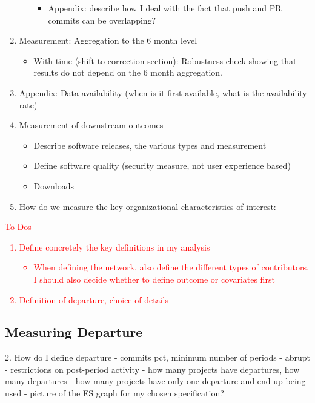\documentclass[12pt,notitlepage]{article}
\begin{document}
\begin{enumerate}
\begin{itemize}
\begin{itemize}
            \item Appendix: describe how I deal with the fact that push and PR commits can be overlapping? 
        \end{itemize}
    \end{itemize}
    \item Measurement: Aggregation to the 6 month level
    \begin{itemize}
        \item With time (shift to correction section): Robustness check showing that results do not depend on the 6 month aggregation. 
    \end{itemize}
    \item Appendix: Data availability (when is it first available, what is the availability rate)
    \item Measurement of downstream outcomes
    \begin{itemize}
        \item Describe software releases, the various types and measurement
        \item Define software quality (security measure, not user experience based)
        \item Downloads
    \end{itemize}
    \item How do we measure the key organizational characteristics of interest: 
\end{enumerate}
\textcolor{red}{To Dos
\begin{enumerate}
    \item Define concretely the key definitions in my analysis
    \begin{itemize} 
        \item When defining the network, also define the different types of contributors. I should also decide whether to define outcome or covariates first 
    \end{itemize}
    \item Definition of departure, choice of details 
\end{enumerate}}

\subsection{Measuring Departure}
2. How do I define departure 
- commits pct, minimum number of periods
- abrupt
- restrictions on post-period activity 
- how many projects have departures, how many departures
  - how many projects have only one departure and end up being used
- picture of the ES graph for my chosen specification?
\end{document}
